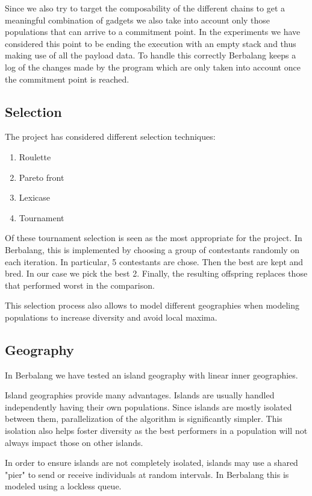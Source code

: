 \documentclass{article}
\begin{document}
Since we also try to target the composability of the different chains to get a meaningful combination of gadgets we also take into account only those populations that can arrive to a commitment point. In the experiments we have considered this point to be ending the execution with an empty stack and thus making use of all the payload data. To handle this correctly Berbalang keeps a log of the changes made by the program which are only taken into account once the commitment point is reached.

\subsection{Selection}
The project has considered different selection techniques:
\begin{enumerate}
    \item Roulette
    \item Pareto front
    \item Lexicase
    \item Tournament
\end{enumerate}

Of these tournament selection is seen as the most appropriate for the project. In Berbalang, this is implemented by choosing a group of contestants randomly on each iteration. In particular, 5 contestants are chose. Then the best are kept and bred. In our case we pick the best 2. Finally, the resulting offspring replaces those that performed worst in the comparison.

This selection process also allows to model different geographies when modeling populations to increase diversity and avoid local maxima.

\subsection{Geography}
In Berbalang we have tested an island geography with linear inner geographies.

Island geographies provide many advantages. Islands are usually handled independently having their own populations. Since islands are mostly isolated between them, parallelization of the algorithm is significantly simpler. This isolation also helps foster diversity as the best performers in a population will not always impact those on other islands. 

In order to ensure islands are not completely isolated, islands may use a shared "pier" to send or receive individuals at random intervals. In Berbalang this is modeled using a lockless queue.
\end{document}
